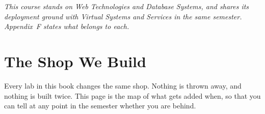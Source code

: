 \vspace{4pt}
{\small\itshape\color{gray!70!black}
This course stands on \emph{Web Technologies} and \emph{Database Systems}, and
shares its deployment ground with \emph{Virtual Systems and Services} in the
same semester. Appendix~F states what belongs to each.}

\newpage

\chapter*{The Shop We Build}

Every lab in this book changes the same shop. Nothing is thrown away, and
nothing is built twice. This page is the map of what gets added when, so that
you can tell at any point in the semester whether you are behind.

